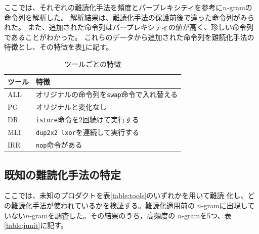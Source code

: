 \documentclass[a4j,fleqn,10pt]{jarticle}
\begin{document}


ここでは、それぞれの難読化手法を頻度とパープレキシティを参考に$n$-gramの命令列を解析した。
解析結果は、難読化手法の保護前後で違った命令列がみられた。
また、追加された命令列はパープレキシティの値が高く、珍しい命令列であることがわかった。
これらのデータから追加された命令列を難読化手法の特徴とし、その特徴を表\ref{table:features}に記す。

\begin{table}[t]
  \centering
  \footnotesize{
    \caption{ツールごとの特徴}\label{table:features}
  \begin{tabular}{l|l}
    ツール              & 特徴　\\ \hline
    ALL & オリジナルの命令列を\texttt{swap}命令で入れ替える \\
    PG  & オリジナルと変化なし \\
    DR  & \texttt{istore}命令を2回続けて実行する \\
    MLI & \texttt{dup2x2 lxor}を連続して実行する \\
    IRR & \texttt{nop}命令がある \\
  \end{tabular}}
\end{table}

\subsection{既知の難読化手法の特定}

ここでは、未知のプロダクトを表\ref{table:tools}のいずれかを用いて難読
化し、どの難読化手法が使われているかを検証する。難読化適用前の
$n$-gramに出現していない$n$-gramを調査した。その結果のうち，高頻度の
$n$-gramを5つ、表\ref{table:junit}に記す。
\end{document}
